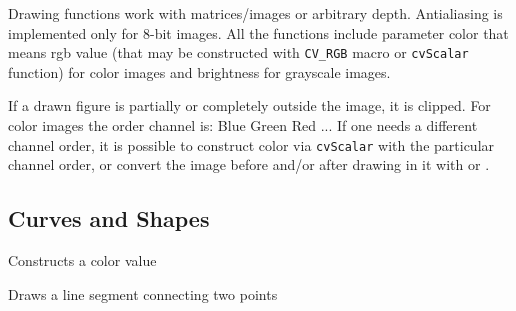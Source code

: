 Drawing functions work with matrices/images or arbitrary depth.
Antialiasing is implemented only for 8-bit images. All the functions
include parameter color that means rgb value (that may be constructed
with \texttt{CV\_RGB} macro or \texttt{cvScalar} function) for color
images and brightness for grayscale images.

If a drawn figure is partially or completely outside the image, it
is clipped. For color images the order channel is: Blue Green Red
... If one needs a different channel order, it is possible to
construct color via \texttt{cvScalar} with the particular channel
order, or convert the image before and/or after drawing in it with
 or .

\subsection{Curves and Shapes}

\label{CV_RGB}

Constructs a color value


\label{Line}

Draws a line segment connecting two points


\begin{description}
\end{description}

